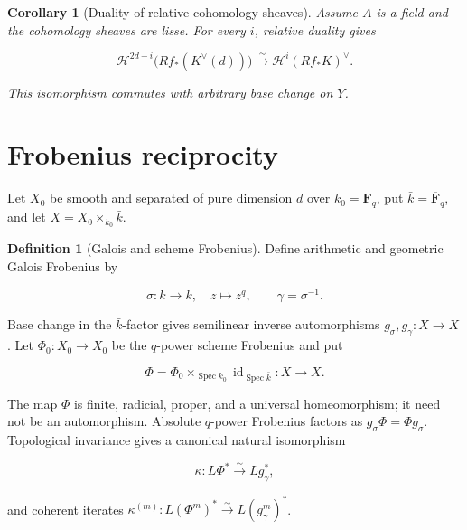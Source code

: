 \documentclass[10pt]{article}
\newtheorem{corollary}[theorem]{Corollary}
\theoremstyle{definition}
\newtheorem{definition}[theorem]{Definition}
\begin{document}
\begin{corollary}[Duality of relative cohomology sheaves]
Assume \(A\) is a field and the cohomology sheaves are lisse.  For every
\(i\), relative duality gives

\[
 \mathcal H^{2d-i}\bigl(Rf_*(K^\vee(d))\bigr)
 \xrightarrow{\sim}
 \mathcal H^i(Rf_*K)^\vee.
\]

This isomorphism commutes with arbitrary base change on \(Y\).
\end{corollary}

\section{Frobenius reciprocity}

Let \(X_0\) be smooth and separated of pure dimension \(d\) over
\(k_0=\mathbf F_q\), put \(\bar k=\overline{\mathbf F}_q\), and let
\(X=X_0\times_{k_0}\bar k\).

\begin{definition}[Galois and scheme Frobenius]
Define arithmetic and geometric Galois Frobenius by

\[
 \sigma:\bar k\longrightarrow\bar k,\quad z\longmapsto z^q,
 \qquad \gamma=\sigma^{-1}.
\]

Base change in the \(\bar k\)-factor gives semilinear inverse automorphisms
\(g_\sigma,g_\gamma:X\to X\).  Let
\(\Phi_0:X_0\to X_0\) be the \(q\)-power scheme Frobenius and put

\[
 \Phi=\Phi_0\times_{\operatorname{Spec}k_0}
 \operatorname{id}_{\operatorname{Spec}\bar k}:X\longrightarrow X.
\]

The map \(\Phi\) is finite, radicial, proper, and a universal homeomorphism;
it need not be an automorphism.  Absolute \(q\)-power Frobenius factors as
\(g_\sigma\Phi=\Phi g_\sigma\).  Topological invariance gives a canonical
natural isomorphism

\[
 \kappa:L\Phi^*\xrightarrow{\sim}Lg_\gamma^*,
\]

and coherent iterates
\(
 \kappa^{(m)}:L(\Phi^m)^*\xrightarrow{\sim}L(g_\gamma^m)^*
\).
\end{definition}
\end{document}
